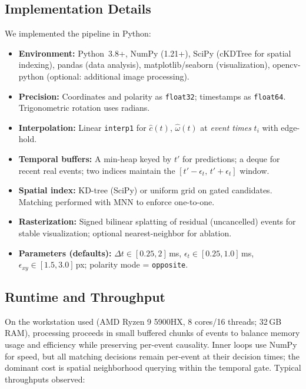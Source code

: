 \subsection{Implementation Details}
We implemented the pipeline in Python:
\begin{itemize}
    \item \textbf{Environment:} Python~3.8+, NumPy (1.21+), SciPy (cKDTree for spatial indexing), pandas (data analysis), matplotlib/seaborn (visualization), opencv-python (optional: additional image processing).
  \item \textbf{Precision:} Coordinates and polarity as \texttt{float32}; timestamps as \texttt{float64}. Trigonometric rotation uses radians.
  \item \textbf{Interpolation:} Linear \texttt{interp1} for $\hat c(t)$, $\hat\omega(t)$ at \emph{event times} $t_i$ with edge-hold.
  \item \textbf{Temporal buffers:} A min-heap keyed by $t'$ for predictions; a deque for recent real events; two indices maintain the $[t'-\epsilon_t,\,t'+\epsilon_t]$ window.
  \item \textbf{Spatial index:} KD-tree (SciPy) or uniform grid on gated candidates. Matching performed with MNN to enforce one-to-one.
  \item \textbf{Rasterization:} Signed bilinear splatting of residual (uncancelled) events for stable visualization; optional nearest-neighbor for ablation.
  \item \textbf{Parameters (defaults):} $\Delta t \in [0.25, 2]$\,ms, $\epsilon_t \in [0.25, 1.0]$\,ms, $\epsilon_{xy}\in [1.5, 3.0]$\,px; polarity mode = \texttt{opposite}.
\end{itemize}

\subsection{Runtime and Throughput}
On the workstation used (AMD Ryzen 9 5900HX, 8 cores/16 threads; 32\,GB RAM), processing proceeds in small buffered chunks of events to balance memory usage and efficiency while preserving per-event causality. Inner loops use NumPy for speed, but all matching decisions remain per-event at their decision times; the dominant cost is spatial neighborhood querying within the temporal gate. Typical throughputs observed:

